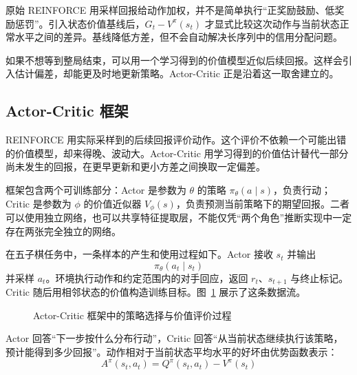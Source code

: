 \begin{importantnote}
原始 REINFORCE 用采样回报给动作加权，并不是简单执行“正奖励鼓励、低奖励惩罚”。引入状态价值基线后，$G_t-V^\pi(s_t)$ 才显式比较这次动作与当前状态正常水平之间的差异。基线降低方差，但不会自动解决长序列中的信用分配问题。
\end{importantnote}

如果不想等到整局结束，可以用一个学习得到的价值模型近似后续回报。这样会引入估计偏差，却能更及时地更新策略。Actor-Critic 正是沿着这一取舍建立的。

\subsection{Actor-Critic 框架}

REINFORCE 用实际采样到的后续回报评价动作。这个评价不依赖一个可能出错的价值模型，却来得晚、波动大。Actor-Critic 用学习得到的价值估计替代一部分尚未发生的回报，在更早更新和更小方差之间换取一定偏差。

框架包含两个可训练部分：Actor 是参数为 $\theta$ 的策略 $\pi_\theta(a\mid s)$，负责行动；Critic 是参数为 $\phi$ 的价值近似器 $V_\phi(s)$，负责预测当前策略下的期望回报。二者可以使用独立网络，也可以共享特征提取层，不能仅凭“两个角色”推断实现中一定存在两张完全独立的网络。

在五子棋任务中，一条样本的产生和使用过程如下。Actor 接收 $s_t$ 并输出
\begin{equation}
\pi_{\theta}(a_t\mid s_t)
\end{equation}
并采样 $a_t$。环境执行动作和约定范围内的对手回应，返回 $r_t$、$s_{t+1}$ 与终止标记。Critic 随后用相邻状态的价值构造训练目标。图~\ref{fig:actor_critic_framework} 展示了这条数据流。

\begin{figure}[htbp]
  \centering
  \caption{Actor-Critic 框架中的策略选择与价值评价过程}
  \label{fig:actor_critic_framework}
\end{figure}

Actor 回答“下一步按什么分布行动”，Critic 回答“从当前状态继续执行该策略，预计能得到多少回报”。动作相对于当前状态平均水平的好坏由优势函数表示：
\begin{equation}
A^{\pi}(s_t,a_t)
=
Q^{\pi}(s_t,a_t)
-
V^{\pi}(s_t)
\end{equation}

